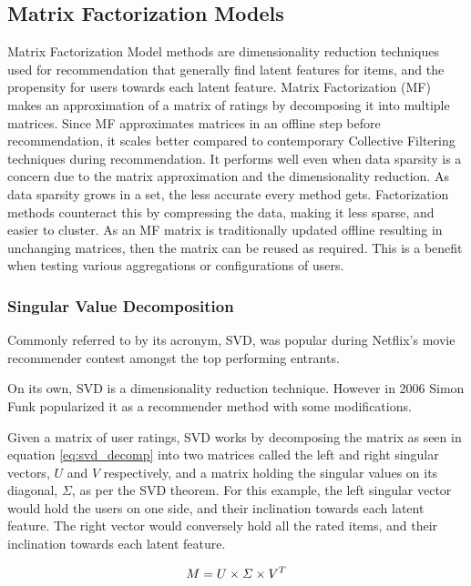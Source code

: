 \subsection{Matrix Factorization Models} \label{bg:sub:factorizationmodels}
Matrix Factorization Model methods are dimensionality reduction techniques used for recommendation that generally find latent features for items, and the propensity for users towards each latent feature.
Matrix Factorization (MF) makes an approximation of a matrix of ratings by decomposing it into multiple matrices. Since MF approximates matrices in an offline step before recommendation, it scales better compared to contemporary Collective Filtering techniques during recommendation. It performs well even when data sparsity is a concern due to the matrix approximation and the dimensionality reduction.
As data sparsity grows in a set, the less accurate every method gets. Factorization methods counteract this by compressing the data, making it less sparse, and easier to cluster.
As an MF matrix is traditionally updated offline resulting in unchanging matrices, then the matrix can be reused as required. This is a benefit when testing various aggregations or configurations of users.

\subsubsection{Singular Value Decomposition}
Commonly referred to by its acronym, SVD, was popular during Netflix's movie recommender contest amongst the top performing entrants.

On its own, SVD is a dimensionality reduction technique. However in 2006 Simon Funk \cite{svdsimonfunk} popularized it as a recommender method with some modifications.

Given a matrix of user ratings, SVD works by decomposing the matrix as seen in equation \ref{eq:svd_decomp} into two matrices called the left and right singular vectors, $U$ and $V$ respectively, and a matrix holding the singular values on its diagonal, $\Sigma$, as per the SVD theorem\cite{svdtheorem}. For this example, the left singular vector would hold the users on one side, and their inclination towards each latent feature. The right vector would conversely hold all the rated items, and their inclination towards each latent feature.

\begin{equation} \label{eq:svd_decomp}
\centering
M = U\times \Sigma \times V^T
\end{equation}

